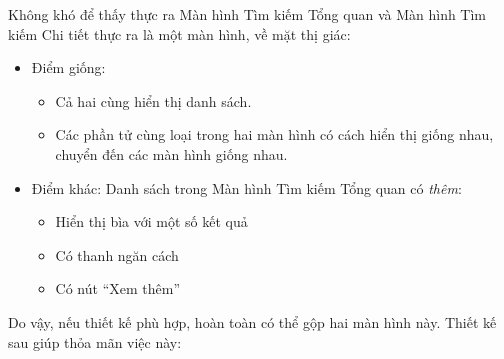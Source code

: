 \documentclass[../../../../thesis]{subfiles}
\begin{document}
Không khó để thấy thực ra Màn hình Tìm kiếm Tổng quan và Màn hình Tìm kiếm Chi
tiết thực ra là một màn hình, về mặt thị giác:

\begin{itemize}
    \item
        Điểm giống:

        \begin{itemize}
            \item
                Cả hai cùng hiển thị danh sách.
            \item
                Các phần tử cùng loại trong hai màn hình có cách hiển thị giống
                nhau, chuyển đến các màn hình giống nhau.
        \end{itemize}
    \item
        Điểm khác: Danh sách trong Màn hình Tìm kiếm Tổng quan có \emph{thêm}:

        \begin{itemize}
            \item
                Hiển thị bìa với một số kết quả
            \item
                Có thanh ngăn cách
            \item
                Có nút ``Xem thêm''
        \end{itemize}
\end{itemize}

Do vậy, nếu thiết kế phù hợp, hoàn toàn có thể gộp hai màn hình này. Thiết kế
sau giúp thỏa mãn việc này:
\end{document}
